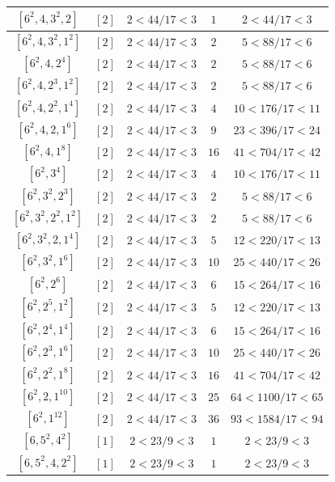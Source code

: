 \documentclass{article}%
\begin{document}
\begin{center}
\begin{longtable}{||c|c|c|c|c||}
$[6^{2}, 4, 3^{2}, 2]$ & $[2]$ & $2 < 44/17 < 3$ & $1$ & $2 < 44/17 < 3$ \\ \hline 
$[6^{2}, 4, 3^{2}, 1^{2}]$ & $[2]$ & $2 < 44/17 < 3$ & $2$ & $5 < 88/17 < 6$ \\ \hline 
$[6^{2}, 4, 2^{4}]$ & $[2]$ & $2 < 44/17 < 3$ & $2$ & $5 < 88/17 < 6$ \\ \hline 
$[6^{2}, 4, 2^{3}, 1^{2}]$ & $[2]$ & $2 < 44/17 < 3$ & $2$ & $5 < 88/17 < 6$ \\ \hline 
$[6^{2}, 4, 2^{2}, 1^{4}]$ & $[2]$ & $2 < 44/17 < 3$ & $4$ & $10 < 176/17 < 11$ \\ \hline 
$[6^{2}, 4, 2, 1^{6}]$ & $[2]$ & $2 < 44/17 < 3$ & $9$ & $23 < 396/17 < 24$ \\ \hline 
$[6^{2}, 4, 1^{8}]$ & $[2]$ & $2 < 44/17 < 3$ & $16$ & $41 < 704/17 < 42$ \\ \hline 
$[6^{2}, 3^{4}]$ & $[2]$ & $2 < 44/17 < 3$ & $4$ & $10 < 176/17 < 11$ \\ \hline 
$[6^{2}, 3^{2}, 2^{3}]$ & $[2]$ & $2 < 44/17 < 3$ & $2$ & $5 < 88/17 < 6$ \\ \hline 
$[6^{2}, 3^{2}, 2^{2}, 1^{2}]$ & $[2]$ & $2 < 44/17 < 3$ & $2$ & $5 < 88/17 < 6$ \\ \hline 
$[6^{2}, 3^{2}, 2, 1^{4}]$ & $[2]$ & $2 < 44/17 < 3$ & $5$ & $12 < 220/17 < 13$ \\ \hline 
$[6^{2}, 3^{2}, 1^{6}]$ & $[2]$ & $2 < 44/17 < 3$ & $10$ & $25 < 440/17 < 26$ \\ \hline 
$[6^{2}, 2^{6}]$ & $[2]$ & $2 < 44/17 < 3$ & $6$ & $15 < 264/17 < 16$ \\ \hline 
$[6^{2}, 2^{5}, 1^{2}]$ & $[2]$ & $2 < 44/17 < 3$ & $5$ & $12 < 220/17 < 13$ \\ \hline 
$[6^{2}, 2^{4}, 1^{4}]$ & $[2]$ & $2 < 44/17 < 3$ & $6$ & $15 < 264/17 < 16$ \\ \hline 
$[6^{2}, 2^{3}, 1^{6}]$ & $[2]$ & $2 < 44/17 < 3$ & $10$ & $25 < 440/17 < 26$ \\ \hline 
$[6^{2}, 2^{2}, 1^{8}]$ & $[2]$ & $2 < 44/17 < 3$ & $16$ & $41 < 704/17 < 42$ \\ \hline 
$[6^{2}, 2, 1^{10}]$ & $[2]$ & $2 < 44/17 < 3$ & $25$ & $64 < 1100/17 < 65$ \\ \hline 
$[6^{2}, 1^{12}]$ & $[2]$ & $2 < 44/17 < 3$ & $36$ & $93 < 1584/17 < 94$ \\ \hline 
$[6, 5^{2}, 4^{2}]$ & $[1]$ & $2 < 23/9 < 3$ & $1$ & $2 < 23/9 < 3$ \\ \hline 
$[6, 5^{2}, 4, 2^{2}]$ & $[1]$ & $2 < 23/9 < 3$ & $1$ & $2 < 23/9 < 3$ \\ \hline 

\end{longtable}
\end{center}
\end{document}
